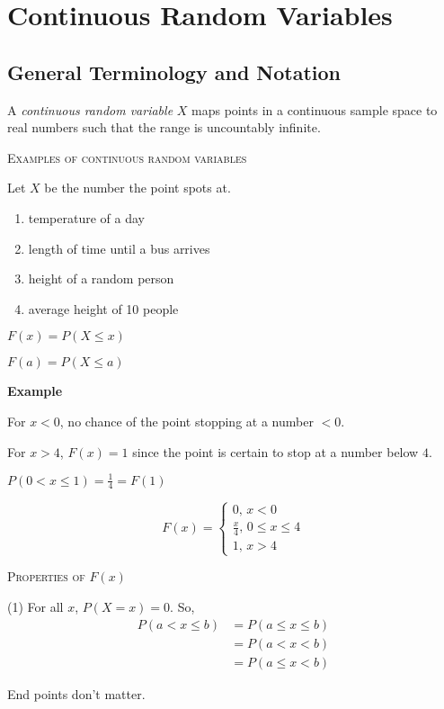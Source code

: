 \chapter{Continuous Random Variables}
\section{General Terminology and Notation}
A \emph{continuous random variable} $ X $ maps points in a continuous
sample space to real numbers such that the range is uncountably infinite.

\textsc{Examples of continuous random variables}

Let $ X $ be the number the point spots at.
\begin{enumerate}[label=(\arabic*)]
    \item temperature of a day
    \item length of time until a bus arrives
    \item height of a random person
    \item average height of 10 people
\end{enumerate}

$F(x)=P(X\le x)$

$F(a)=P(X\le a) $

\textbf{Example}

For $ x<0 $, no chance of the point stopping at a number $ <0 $.

For $ x>4 $, $ F(x)=1 $ since the point is certain to stop at a number
below $ 4 $.

$ P(0<x\le 1)=\frac{1}{4}=F(1) $

\[ F(x)=\begin{cases}
        0,\, x<0                  \\
        \frac{x}{4},\,0\le x\le 4 \\
        1,\,x>4
    \end{cases} \]

\textsc{Properties of $ F(x) $}

(1) For all $ x $, $ P(X=x)=0 $. So,
\begin{align*}
    P(a<x\le b) & =P(a\le x\le b) \\
                & =P(a<x<b)       \\
                & =P(a\le x<b)
\end{align*}
\begin{remark}
    End points don't matter.
\end{remark}

